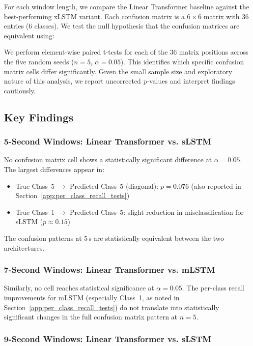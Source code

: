 For each window length, we compare the Linear Transformer baseline against the best-performing \ac{xLSTM} variant. Each confusion matrix is a \(6 \times 6\) matrix with 36 entries (6 classes). We test the null hypothesis that the confusion matrices are equivalent using:

We perform element-wise paired t-tests for each of the 36 matrix positions across the five random seeds ($n=5$, $\alpha=0.05$). This identifies which specific confusion matrix cells differ significantly. Given the small sample size and exploratory nature of this analysis, we report uncorrected p-values and interpret findings cautiously.

\subsection{Key Findings}

\subsubsection{5-Second Windows: Linear Transformer vs. sLSTM}

No confusion matrix cell shows a statistically significant difference at $\alpha = 0.05$. The largest differences appear in:
\begin{itemize}
\item True Class~5 $\to$ Predicted Class~5 (diagonal): $p=0.076$ (also reported in Section~\ref{app:per_class_recall_tests})
\item True Class~1 $\to$ Predicted Class~5: slight reduction in misclassification for \ac{sLSTM} ($p \approx 0.15$)
\end{itemize}

The confusion patterns at 5\,s are statistically equivalent between the two architectures.

\subsubsection{7-Second Windows: Linear Transformer vs. mLSTM}

Similarly, no cell reaches statistical significance at $\alpha = 0.05$. The per-class recall improvements for \ac{mLSTM} (especially Class~1, as noted in Section~\ref{app:per_class_recall_tests}) do not translate into statistically significant changes in the full confusion matrix pattern at $n=5$.

\subsubsection{9-Second Windows: Linear Transformer vs. sLSTM}

